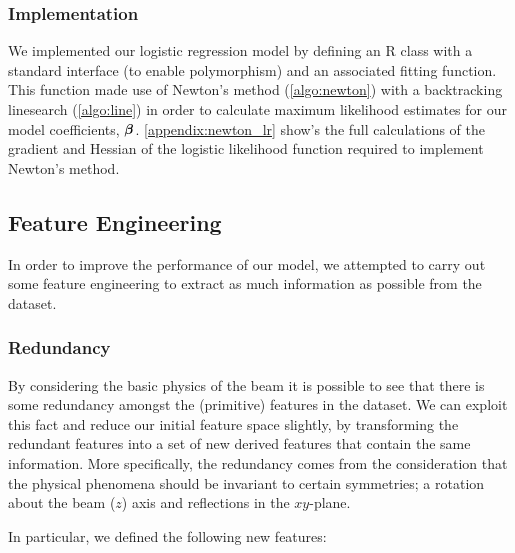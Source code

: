 \subsubsection{Implementation}
We implemented our logistic regression model by defining an R class with a standard interface (to enable polymorphism) and an associated fitting function. This function made use of Newton's method (\ref{algo:newton}) with a backtracking linesearch (\ref{algo:line}) in order to calculate maximum likelihood estimates for our model coefficients, $\bm{\beta}$. \ref{appendix:newton_lr} show's the full calculations of the gradient and Hessian of the logistic likelihood function required to implement Newton's method.



\subsection{Feature Engineering}
In order to improve the performance of our model, we attempted to carry out some feature engineering to extract as much information as possible from the dataset.

\subsubsection{Redundancy}
By considering the basic physics of the beam it is possible to see that there is some redundancy amongst the (primitive) features in the dataset. We can exploit this fact and reduce our initial feature space slightly, by transforming the redundant features into a set of new derived features that contain the same information. 
More specifically, the redundancy comes from the consideration that the physical phenomena should be invariant to certain symmetries; a rotation about the beam ($z$) axis and reflections in the $xy$-plane.

In particular, we defined the following new features:

